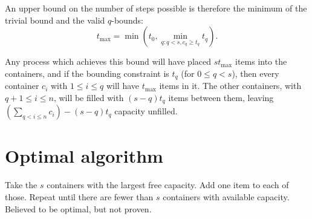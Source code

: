 \documentclass[a4paper,10pt]{article}
\begin{document}
An upper bound on the number of steps possible is therefore the
minimum of the trivial bound and the valid $q$-bounds:
\begin{equation}
  \label{upper-bound-eqn}
  t_{\max} = \min\left(t_0, \min_{q: q < s, c_q \ge t_q} t_q\right).
\end{equation}

Any process which achieves this bound will have placed $s t_{\max}$
items into the containers, and if the bounding constraint is $t_q$
(for $0 \le q < s$), then every container $c_i$ with $1 \le i \le q$
will have $t_{\max}$ items in it. The other containers, with $q+1 \le
i \le n$, will be filled with $(s-q)t_q$ items between them, leaving
$(\sum_{q<i\le n} c_i)-(s-q)t_q$ capacity unfilled.

\section{Optimal algorithm}
\label{algorithm}

Take the $s$ containers with the largest free capacity. Add one item
to each of those. Repeat until there are fewer than $s$ containers
with available capacity. Believed to be optimal, but not proven.
\end{document}
